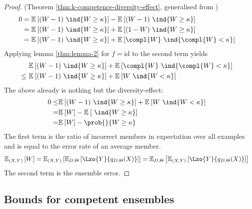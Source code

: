 \documentclass[../main.tex]{subfiles}
\begin{document}
\begin{proof} (Theorem \ref{thm:k-competence-diversity-effect}, generalised from \cite{theisen_WhenAreEnsembles_2023})
    \begin{align*}
        0 &= \mathbb{E}_{}\left[ (W-1)~\ind{W \geq \kappa} \right]  - \mathbb{E}_{}\left[ (W-1) ~\ind{W \geq \kappa} \right]  \\
        &= \mathbb{E}_{}\left[ (W-1)~\ind{W \geq \kappa} \right]  + \mathbb{E}_{}\left[ (1-W)~\ind{W \geq \kappa} \right]  \\
        &= \mathbb{E}_{}\left[ (W-1)~\ind{W \geq \kappa} \right]  + \mathbb{E}_{}\left[  \compl{W} ~\ind{\compl{W} < \kappa} \right]   \\
    \end{align*}
    Applying lemma \ref{thm:lemma-2} for $f = \text{id}$ to the second term yields
    \begin{align*}
        & \mathbb{E}_{}\left[ (W-1)~\ind{W \geq \kappa} \right]  + \mathbb{E}_{}\left[  \compl{W} ~\ind{\compl{W} < \kappa} \right]   \\  
        \leq~ &  \mathbb{E}_{}\left[ (W-1)~\ind{W \geq \kappa} \right]  + \mathbb{E}_{}\left[ W ~\ind{W < \kappa} \right] 
    \end{align*}
    The above already is nothing but the diversity-effect:
    \begin{align*}
        0 \leq& \mathbb{E}_{}\left[ (W-1)~\ind{W \geq \kappa} \right]  + \mathbb{E}_{}\left[ W ~\ind{W < \kappa} \right]  \\
        = & \mathbb{E}_{}\left[ W  \right]  - \mathbb{E}_{}\left[ ~\ind{W \geq \kappa} \right]  \\
        = & \mathbb{E}_{}\left[ W \right]  - \prob{}{W \geq \kappa}
    \end{align*}
    The first term is the ratio of incorrect members in expectation over all examples and is equal to the error rate of an average member.
    \begin{align*} 
    \mathbb{E}_{(X,Y) }\left[ W  \right]  = \mathbb{E}_{(X,Y) }\left[ \mathbb{E}_{D,\Theta}\left[ \Lzo{Y}{q_{D,\Theta}(X)} \right]  \right]  = \mathbb{E}_{D,\Theta}\left[ \mathbb{E}_{(X,Y) }\left[ \Lzo{Y}{q_{D,\Theta}(X)} \right]  \right] 
    \end{align*}
    The second term is the ensemble error. 
\end{proof}

\subsection{Bounds for competent ensembles}
\end{document}
